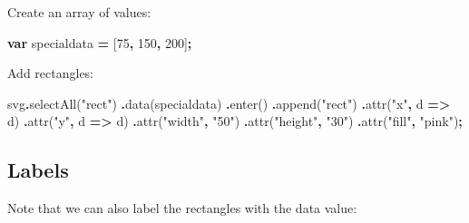 \documentclass[
  openany]{book}
\newenvironment{Shaded}{\begin{snugshade}}{\end{snugshade}}
\newcommand{\DecValTok}[1]{\textcolor[rgb]{0.00,0.00,0.81}{#1}}
\newcommand{\FunctionTok}[1]{\textcolor[rgb]{0.00,0.00,0.00}{#1}}
\newcommand{\KeywordTok}[1]{\textcolor[rgb]{0.13,0.29,0.53}{\textbf{#1}}}
\newcommand{\NormalTok}[1]{#1}
\newcommand{\OperatorTok}[1]{\textcolor[rgb]{0.81,0.36,0.00}{\textbf{#1}}}
\newcommand{\StringTok}[1]{\textcolor[rgb]{0.31,0.60,0.02}{#1}}
\begin{document}
Create an array of values:

\begin{Shaded}
\begin{Highlighting}[]
\KeywordTok{var}\NormalTok{ specialdata }\OperatorTok{=}\NormalTok{ [}\DecValTok{75}\OperatorTok{,} \DecValTok{150}\OperatorTok{,} \DecValTok{200}\NormalTok{]}\OperatorTok{;}
\end{Highlighting}
\end{Shaded}

Add rectangles:

\begin{Shaded}
\begin{Highlighting}[]
\NormalTok{  svg}\OperatorTok{.}\FunctionTok{selectAll}\NormalTok{(}\StringTok{"rect"}\NormalTok{)}
    \OperatorTok{.}\FunctionTok{data}\NormalTok{(specialdata)}
    \OperatorTok{.}\FunctionTok{enter}\NormalTok{()}
    \OperatorTok{.}\FunctionTok{append}\NormalTok{(}\StringTok{"rect"}\NormalTok{)}
      \OperatorTok{.}\FunctionTok{attr}\NormalTok{(}\StringTok{"x"}\OperatorTok{,}\NormalTok{ d }\KeywordTok{=\textgreater{}}\NormalTok{ d)}
      \OperatorTok{.}\FunctionTok{attr}\NormalTok{(}\StringTok{"y"}\OperatorTok{,}\NormalTok{ d }\KeywordTok{=\textgreater{}}\NormalTok{ d)}
      \OperatorTok{.}\FunctionTok{attr}\NormalTok{(}\StringTok{"width"}\OperatorTok{,} \StringTok{"50"}\NormalTok{)}
      \OperatorTok{.}\FunctionTok{attr}\NormalTok{(}\StringTok{"height"}\OperatorTok{,} \StringTok{"30"}\NormalTok{)}
      \OperatorTok{.}\FunctionTok{attr}\NormalTok{(}\StringTok{"fill"}\OperatorTok{,} \StringTok{"pink"}\NormalTok{)}\OperatorTok{;}
\end{Highlighting}
\end{Shaded}

\hypertarget{labels}{%
\subsection{Labels}\label{labels}}

Note that we can also label the rectangles with the data value:
\end{document}
